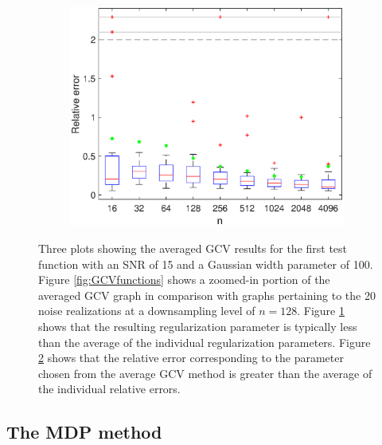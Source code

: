 \documentclass[12pt]{article}
\begin{document}
\begin{figure}
\begin{subfigure}[b]{0.45\textwidth}
        \label{fig:GCVlambdas}
    \end{subfigure}
    \begin{subfigure}[b]{0.45\textwidth}
        \includegraphics[width=\textwidth]{Figures/GCV_ErrPlot1D_F1_S15_W100_R20.eps}
        \caption{}
        \label{fig:GCVerrors}
    \end{subfigure}
    \caption{Three plots showing the averaged GCV results for the first test function with an SNR of 15 and a Gaussian width parameter of 100. Figure \ref{fig:GCVfunctions} shows a zoomed-in portion of the averaged GCV graph in comparison with graphs pertaining to the 20 noise realizations at a downsampling level of $n = 128$. Figure \ref{fig:GCVlambdas} shows that the resulting regularization parameter is typically less than the average of the individual regularization parameters. Figure \ref{fig:GCVerrors} shows that the relative error corresponding to the parameter chosen from the average GCV method is greater than the average of the individual relative errors.}
\label{fig:GCVplots}
\end{figure}

\subsection{The MDP method} \label{The MDP method}
\end{document}

